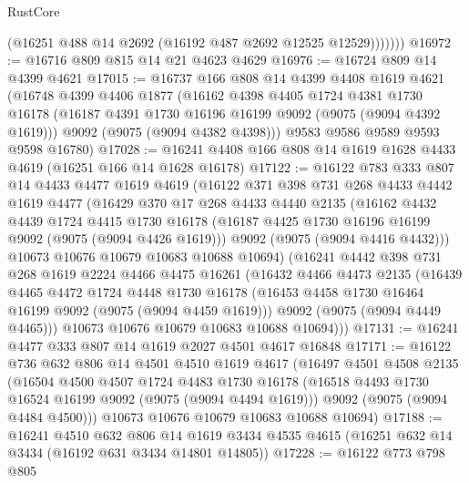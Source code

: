 \begin{lexlean}{RustCore}
\begin{coremodule}
              (@16251 @488 @14 @2692 (@16192 @487 @2692 @12525 @12529)))))))
@16972 := @16716 @809 @815 @14 @21 @4623 @4629
@16976 := @16724 @809 @14 @4399 @4621
@17015 := @16737
    @166
    @808
    @14
    @4399
    @4408
    @1619
    @4621
    (@16748
      @4399
      @4406
      @1877
      (@16162
        @4398
        @4405
        @1724
        @4381
        @1730
        @16178
        (@16187 @4391 @1730 @16196 @16199 @9092 (@9075 (@9094 @4392 @1619)))
        @9092
        (@9075 (@9094 @4382 @4398)))
      @9583
      @9586
      @9589
      @9593
      @9598
      @16780)
@17028 := @16241 @4408 @166 @808 @14 @1619 @1628 @4433 @4619 (@16251 @166 @14 @1628 @16178)
@17122 := @16122
    @783
    @333
    @807
    @14
    @4433
    @4477
    @1619
    @4619
    (@16122
      @371
      @398
      @731
      @268
      @4433
      @4442
      @1619
      @4477
      (@16429
        @370
        @17
        @268
        @4433
        @4440
        @2135
        (@16162
          @4432
          @4439
          @1724
          @4415
          @1730
          @16178
          (@16187 @4425 @1730 @16196 @16199 @9092 (@9075 (@9094 @4426 @1619)))
          @9092
          (@9075 (@9094 @4416 @4432)))
        @10673
        @10676
        @10679
        @10683
        @10688
        @10694)
      (@16241
        @4442
        @398
        @731
        @268
        @1619
        @2224
        @4466
        @4475
        @16261
        (@16432
          @4466
          @4473
          @2135
          (@16439
            @4465
            @4472
            @1724
            @4448
            @1730
            @16178
            (@16453 @4458 @1730 @16464 @16199 @9092 (@9075 (@9094 @4459 @1619)))
            @9092
            (@9075 (@9094 @4449 @4465)))
          @10673
          @10676
          @10679
          @10683
          @10688
          @10694)))
@17131 := @16241 @4477 @333 @807 @14 @1619 @2027 @4501 @4617 @16848
@17171 := @16122
    @736
    @632
    @806
    @14
    @4501
    @4510
    @1619
    @4617
    (@16497
      @4501
      @4508
      @2135
      (@16504
        @4500
        @4507
        @1724
        @4483
        @1730
        @16178
        (@16518 @4493 @1730 @16524 @16199 @9092 (@9075 (@9094 @4494 @1619)))
        @9092
        (@9075 (@9094 @4484 @4500)))
      @10673
      @10676
      @10679
      @10683
      @10688
      @10694)
@17188 := @16241
    @4510
    @632
    @806
    @14
    @1619
    @3434
    @4535
    @4615
    (@16251 @632 @14 @3434 (@16192 @631 @3434 @14801 @14805))
@17228 := @16122
    @773
    @798
    @805

\end{coremodule}
\end{lexlean}
